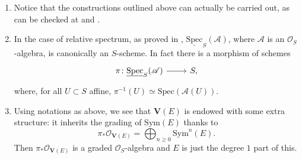 \documentclass[../Main]{subfiles}
\begin{document}
\begin{rem}[]\leavevmode\vspace{-.2\baselineskip}
\begin{enumerate}
	\item Notice that the constructions outlined above can actually be carried out,
		as can be checked at 
		\cite[\href{https://stacks.math.columbia.edu/tag/01LL}{Section 01LL}]{SP}
		and
		\cite[\href{https://stacks.math.columbia.edu/tag/01M1}{Section 01M1}]{SP}.

	\item In the case of relative spectrum, as proved in 
		\cite[\href{https://stacks.math.columbia.edu/tag/01LP}{Lemma 01LP}]{SP},
		$\underline{\mathrm{Spec}}_S(\mathscr{A})$, where $\mathscr{A}$ is
		an $\mathcal{O}_{ S }$-algebra, is canonically an $S$-scheme.
		In fact there is a morphism of schemes
		\begin{equation*}
		\begin{tikzcd}[row sep = 0ex
			,/tikz/column 1/.append style={anchor=base east}
			,/tikz/column 2/.append style={anchor=base west}]
			\pi\colon \underline{\mathrm{Spec}}_S(\mathscr{A})
			\arrow[r, "", rightarrow] &
			S
		,\end{tikzcd}
		\end{equation*} 
		where, for all $U \subset S$ affine, $\pi^{-1}(U) \simeq \mathrm{Spec}(\mathscr{A}(U))$.

	\item Using notations as above, we see that $\mathbf{V}(E)$ is endowed with
		some extra structure: it inherits the grading of $\mathrm{Sym}(E)$
		thanks to
		\begin{equation*}
			\pi_* \mathcal{O}_{ \mathbf{V}(E) } =
			\bigoplus_{n \geq 0} \mathrm{Sym}^n(E)
		.\end{equation*}
		Then $\pi_* \mathcal{O}_{ \mathbf{V}(E) }$ is a graded
		$\mathcal{O}_{ S }$-algebra and $E$ is just the degree $1$ part
		of this.
\end{enumerate}
\end{rem}
\end{document}

